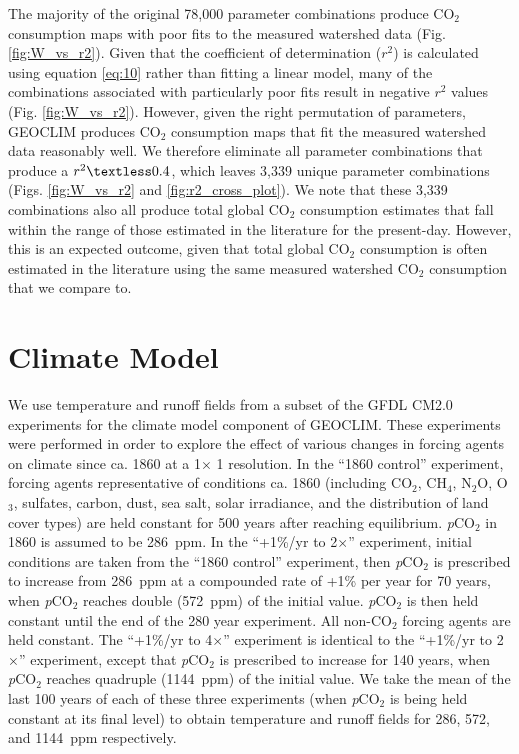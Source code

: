 \documentclass[11pt,letterpaper]{article}
\newcommand{\degrees}{\textdegree\xspace}
\newcommand{\pCOtwo}{\textit{p}CO$_{2}$\xspace}
\newcommand{\COtwo}{CO$_{2}$\xspace}
\begin{document}
The majority of the original 78,000 parameter combinations produce \COtwo consumption maps with poor fits to the measured watershed data (Fig. \ref{fig:W_vs_r2}). Given that the coefficient of determination ($r^{2}$) is calculated using equation \ref{eq:10} rather than fitting a linear model, many of the combinations associated with particularly poor fits result in negative $r^{2}$ values (Fig. \ref{fig:W_vs_r2}). However, given the right permutation of parameters, GEOCLIM produces \COtwo consumption maps that fit the measured watershed data reasonably well. We therefore eliminate all parameter combinations that produce a $r^{2}\textless0.4$, which leaves 3,339 unique parameter combinations (Figs. \ref{fig:W_vs_r2} and \ref{fig:r2_cross_plot}). We note that these 3,339 combinations also all produce total global \COtwo consumption estimates that fall within the range of those estimated in the literature for the present-day. However, this is an expected outcome, given that total global \COtwo consumption is often estimated in the literature using the same measured watershed \COtwo consumption that we compare to.

\section*{Climate Model}

We use temperature and runoff fields from a subset of the GFDL CM2.0 experiments \citep{Delworth2006a, Delworth2006b} for the climate model component of GEOCLIM. These experiments were performed in order to explore the effect of various changes in forcing agents on climate since ca. 1860 at a 1\degrees $\times$ 1\degrees resolution. In the ``1860 control'' experiment, forcing agents representative of conditions ca. 1860 (including \COtwo, CH$_{4}$, N$_{2}$O, O$_{3}$, sulfates, carbon, dust, sea salt, solar irradiance, and the distribution of land cover types) are held constant for 500 years after reaching equilibrium. \pCOtwo in 1860 is assumed to be 286~ppm. In the ``+1\%/yr to 2$\times$'' experiment, initial conditions are taken from the ``1860 control'' experiment, then \pCOtwo is prescribed to increase from 286~ppm at a compounded rate of +1\% per year for 70 years, when \pCOtwo reaches double (572~ppm) of the initial value. \pCOtwo is then held constant until the end of the 280 year experiment. All non-\COtwo forcing agents are held constant. The ``+1\%/yr to 4$\times$'' experiment is identical to the ``+1\%/yr to 2$\times$'' experiment, except that \pCOtwo is prescribed to increase for 140 years, when \pCOtwo reaches quadruple (1144~ppm) of the initial value. We take the mean of the last 100 years of each of these three experiments (when \pCOtwo is being held constant at its final level) to obtain temperature and runoff fields for 286, 572, and 1144~ppm respectively.
\end{document}

